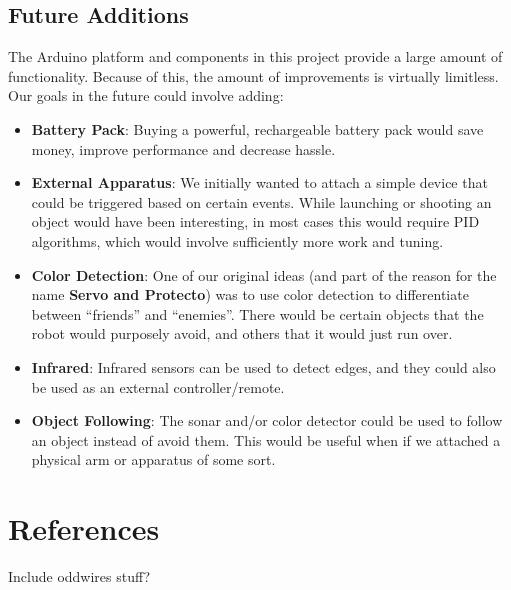 \documentclass[11pt]{article}
\begin{document}
\subsection{Future Additions}
The Arduino platform and components in this project provide a large amount of functionality.  Because of this, the amount of improvements is virtually limitless.  Our goals in the future could involve adding:
		\begin{itemize}				
		\item \textbf{Battery Pack}: Buying a powerful, rechargeable battery pack would save money, improve performance and decrease hassle.
		\item \textbf{External Apparatus}: We initially wanted to attach a simple device that could be triggered based on certain events.  While launching or shooting an object would have been interesting, in most cases this would require PID algorithms, which would involve sufficiently more work and tuning.
		\item \textbf{Color Detection}: One of our original ideas (and part of the reason for the name \textbf{Servo and Protecto}) was to use color detection to differentiate between ``friends'' and ``enemies''.  There would be certain objects that the robot would purposely avoid, and others that it would just run over.
		\item \textbf{Infrared}: Infrared sensors can be used to detect edges, and they could also be used as an external controller/remote.
		\item \textbf{Object Following}: The sonar and/or color detector could be used to follow an object instead of avoid them.  This would be useful when if we attached a physical arm or apparatus of some sort.
		\end{itemize}

\section{References}
Include oddwires stuff?
\end{document}
